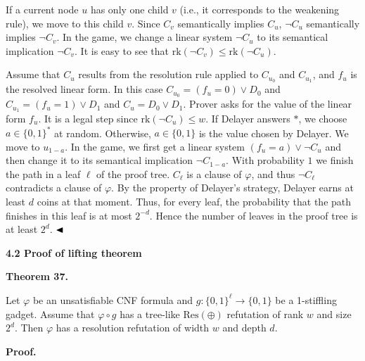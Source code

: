 If a current node $u$ has only one child $v$ (i.e., it corresponds to the weakening rule), we move to this child $v$. Since $C_{v}$ semantically implies $C_{u}$, $\lnot C_{u}$ semantically implies $\lnot C_{v}$. In the game, we change a linear system $\lnot C_{u}$ to its semantical implication $\lnot C_{v}$. It is easy to see that $\mathrm{rk}(\lnot C_{v})\leq\mathrm{rk}(\lnot C_{u})$.\par



Assume that $C_{u}$ results from the resolution rule applied to $C_{u_{0}}$ and $C_{u_{1}}$, and $f_{u}$ is the resolved linear form. In this case $C_{u_{0}}=(f_{u}=0)\lor D_{0}$ and $C_{u_{1}}=(f_{u}=1)\lor D_{1}$ and $C_{u}=D_{0}\lor D_{1}$.
Prover asks for the value of the linear form $f_{u}$. It is a legal step since $\mathrm{rk}(\lnot C_{u})\leq w$.
If Delayer answers $*$, we choose $a\in\{0,1\}^{*}$ at random. Otherwise, $a\in\{0,1\}$ is the value chosen by Delayer.
We move to $u_{1-a}$. In the game, we first get a linear system $(f_{u}=a)\lor\lnot C_{u}$ and then change it to its semantical implication $\lnot C_{1-a}$.
With probability $1$ we finish the path in a leaf $\ell$ of the proof tree. $C_{\ell}$ is a clause of $\varphi$, and thus $\lnot C_{\ell}$ contradicts a clause of $\varphi$. By the property of Delayer’s strategy, Delayer earns at least $d$ coins at that moment. Thus, for every leaf, the probability that the path finishes in this leaf is at most $2^{-d}$. Hence the number of leaves in the proof tree is at least $2^{d}$.
$\hfill\blacktriangleleft$\par


\par\medskip\noindent\textbf{
4.2 Proof of lifting theorem}\par


\par\medskip\noindent\textbf{
Theorem 37.
}\par



Let $\varphi$ be an unsatisfiable CNF formula and $g\colon\{0,1\}^{\ell}\to\{0,1\}$ be a 1-stiffling gadget.
Assume that $\varphi\circ g$ has a tree-like $\mathrm{Res}(\oplus)$ refutation of rank $w$ and size $2^{d}$. Then $\varphi$ has a resolution refutation of width $w$ and depth $d$.\par



\par\medskip\noindent\textbf{Proof.}\par


